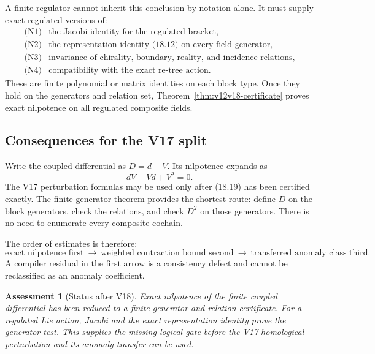 \documentclass[11pt]{article}
\newtheorem{assessment}[theorem]{Assessment}
\theoremstyle{remark}
\begin{document}
A finite regulator cannot inherit this conclusion by notation alone.
It must supply exact regulated versions of:
\[
\begin{array}{ll}
\text{(N1)}&\text{the Jacobi identity for the regulated bracket},\\
\text{(N2)}&\text{the representation identity (18.12) on every
field generator},\\
\text{(N3)}&\text{invariance of chirality, boundary, reality, and
incidence relations},\\
\text{(N4)}&\text{compatibility with the exact re-tree action}.
\end{array}                                                  \tag{18.18}
\]
These are finite polynomial or matrix identities on each block type.
Once they hold on the generators and relation set,
Theorem~\ref{thm:v12v18-certificate} proves exact nilpotence on all
regulated composite fields.

\subsection{Consequences for the V17 split}

Write the coupled differential as \(D=d+V\).  Its nilpotence expands
as
\[
                         dV+Vd+V^2=0.                       \tag{18.19}
\]
The V17 perturbation formulas may be used only after (18.19) has
been certified exactly.  The finite generator theorem provides the
shortest route: define \(D\) on the block generators, check the
relations, and check \(D^2\) on those generators.  There is no need
to enumerate every composite cochain.

The order of estimates is therefore:
\[
 \boxed{
 \text{exact nilpotence first}
 \ \longrightarrow\
 \text{weighted contraction bound second}
 \ \longrightarrow\
 \text{transferred anomaly class third}.}                  \tag{18.20}
\]
A compiler residual in the first arrow is a consistency defect and
cannot be reclassified as an anomaly coefficient.

\begin{assessment}[Status after V18]
\label{ass:v12v18-status}
Exact nilpotence of the finite coupled differential has been reduced
to a finite generator-and-relation certificate.  For a regulated Lie
action, Jacobi and the exact representation identity prove the
generator test.  This supplies the missing logical gate before the
V17 homological perturbation and its anomaly transfer can be used.
\end{assessment}
\end{document}
